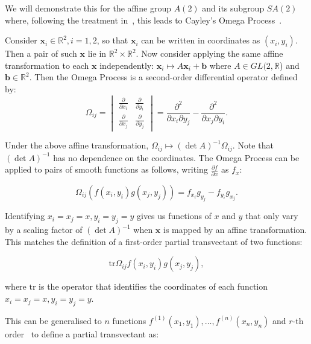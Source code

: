 \documentclass[review,onefignum,onetabnum]{siamonline190516}
\begin{document}
{We will demonstrate this for the affine group $A(2)$ and its subgroup
$SA(2)$ where, following the treatment in~\cite{OlverCIT}, this leads to
Cayley's Omega Process~\cite{Cayley}. 

Consider $\mathbf{x}_i \in \mathbb{R}^2, i=1,2$, so that $\mathbf{x}_i$ can
be written in coordinates as $(x_i, y_i)$. Then a pair of such $\mathbf{x}$ lie in $\mathbb{R}^2 \times \mathbb{R}^2$. Now consider applying the same affine transformation to each $\mathbf{x}$ independently: $\mathbf{x}_i \mapsto A \mathbf{x}_i + \mathbf{b}$ where $A \in GL(2,\mathbb{R}$) and $\mathbf{b} \in \mathbb{R}^2$. Then the Omega Process is a second-order differential operator defined by: 
\begin{equation}
\Omega_{ij} = \begin{vmatrix} \frac{\partial}{\partial x_i} &
\frac{\partial}{\partial y_i} \\ \frac{\partial}{\partial x_j} &
\frac{\partial}{\partial y_j} \end{vmatrix} = 
\frac{\partial^2}{\partial x_i
\partial y_j} - \frac{\partial^2}{\partial x_j \partial y_i}.
\end{equation}

Under the above affine transformation, $\Omega_{ij} \mapsto (\det A)^{-1}
\Omega_{ij}$. Note that $(\det A)^{-1}$ has no dependence on the coordinates.
The Omega Process can be applied to pairs of smooth functions as follows,
writing $\frac{\partial f}{\partial x}$ as $f_x$:

\begin{equation}
\Omega_{ij} \left(f(x_i, y_i) g(x_j, y_j)\right) = f_{x_i}g_{y_j} - f_{y_i}g_{x_j}.
\end{equation}

Identifying $x_i = x_j = x, y_i = y_j = y$ gives us functions of $x$ and $y$
that only vary by a scaling factor of $(\det A)^{-1}$ when $\mathbf{x}$ is
mapped by an affine transformation. This matches the definition of a
first-order partial transvectant of two functions:

\begin{equation}
\mbox{tr} \Omega_{ij} f(x_i, y_i) g(x_j, y_j),
\end{equation}

\noindent where $\mbox{tr}$  is the operator that identifies the coordinates of each function $x_i = x_j = x, y_i = y_j = y$.

This can be generalised to $n$ functions $f^{(1)}(x_1, y_1), \ldots, f^{(n)}(x_n, y_n)$ and $r$-th order~\cite{Olver} to define a partial transvectant as:

}
\end{document}

